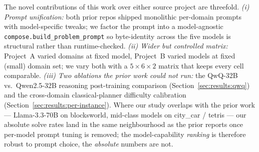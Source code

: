 The novel contributions of this work over either source project are
threefold. \emph{(i) Prompt unification:} both prior repos shipped
monolithic per-domain prompts with model-specific tweaks; we factor
the prompt into a model-agnostic
\texttt{compose.build\_problem\_prompt} so byte-identity across the
five models is structural rather than runtime-checked.
\emph{(ii) Wider but controlled matrix:} Project~A varied domains at
fixed model, Project~B varied models at fixed (small) domain set;
we vary both with a $5\times 6\times 2$ matrix that keeps every cell
comparable. \emph{(iii) Two ablations the prior work could not run:}
the QwQ-32B vs.\ Qwen2.5-32B reasoning post-training comparison
(Section~\ref{sec:results:qwq}) and the cross-domain
classical-planner difficulty calibration
(Section~\ref{sec:results:per-instance}). Where our study overlaps
with the prior work --- Llama-3.3-70B on blocksworld, mid-class
models on city\_car / tetris --- our absolute solve rates land in
the same neighbourhood as the prior reports once per-model prompt
tuning is removed; the model-capability \emph{ranking} is therefore
robust to prompt choice, the \emph{absolute} numbers are not.
